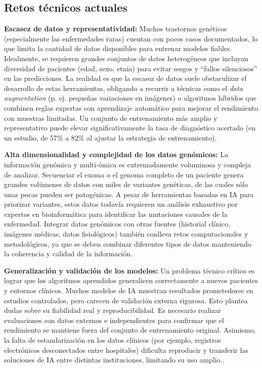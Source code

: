 \documentclass[11pt,a4paper,spanish]{book}
\numberwithin{equation}{chapter}
\numberwithin{figure}{chapter}
\begin{document}
\subsection{Retos técnicos actuales}
\textbf{Escasez de datos y representatividad:} Muchos trastornos genéticos (especialmente las enfermedades raras) cuentan con pocos casos documentados, lo que limita la cantidad de datos disponibles para entrenar modelos fiables. Idealmente, se requieren grandes conjuntos de datos heterogéneos que incluyan diversidad de pacientes (edad, sexo, etnia) para evitar sesgos y ``fallos silenciosos'' en las predicciones\cite{Libbrecht2015,Ching_2018}. La realidad es que la escasez de datos suele obstaculizar el desarrollo de estas herramientas, obligando a recurrir a técnicas como el \textit{data augmentation} (p. ej. pequeñas variaciones en imágenes) o algoritmos híbridos que combinen reglas expertas con aprendizaje automático para mejorar el rendimiento con muestras limitadas\cite{Alsentzer2025}. Un conjunto de entrenamiento más amplio y representativo puede elevar significativamente la tasa de diagnóstico acertado (en un estudio, de 57\% a 82\% al ajustar la estrategia de entrenamiento)\cite{topol2019}.

\textbf{Alta dimensionalidad y complejidad de los datos genómicos:} La información genómica y multi-ómica es extremadamente voluminosa y compleja de analizar. Secuenciar el exoma o el genoma completo de un paciente genera grandes volúmenes de datos con miles de variantes genéticas, de las cuales sólo unas pocas pueden ser patogénicas. A pesar de herramientas basadas en IA para priorizar variantes, estos datos todavía requieren un análisis exhaustivo por expertos en bioinformática para identificar las mutaciones causales de la enfermedad. Integrar datos genómicos con otras fuentes (historial clínico, imágenes médicas, datos fisiológicos) también conlleva retos computacionales y metodológicos, ya que se deben combinar diferentes tipos de datos manteniendo la coherencia y calidad de la información\cite{1364-503X,Libbrecht2015,Ching_2018,vanHilten2024}.

\textbf{Generalización y validación de los modelos:} Un problema técnico crítico es lograr que los algoritmos aprendidos generalicen correctamente a nuevos pacientes y entornos clínicos. Muchos modelos de IA muestran resultados prometedores en estudios controlados, pero carecen de validación externa rigurosa.
Esto plantea dudas sobre su fiabilidad real y reproducibilidad. Es necesario realizar evaluaciones con datos externos e independientes para confirmar que el rendimiento se mantiene fuera del conjunto de entrenamiento original. Asimismo, la falta de estandarización en los datos clínicos (por ejemplo, registros electrónicos desconectados entre hospitales) dificulta reproducir y transferir las soluciones de IA entre distintas instituciones, limitando su uso amplio\cite{Ching_2018,Libbrecht2015,pranav_ia,rajkomar_2019}..
\end{document}
